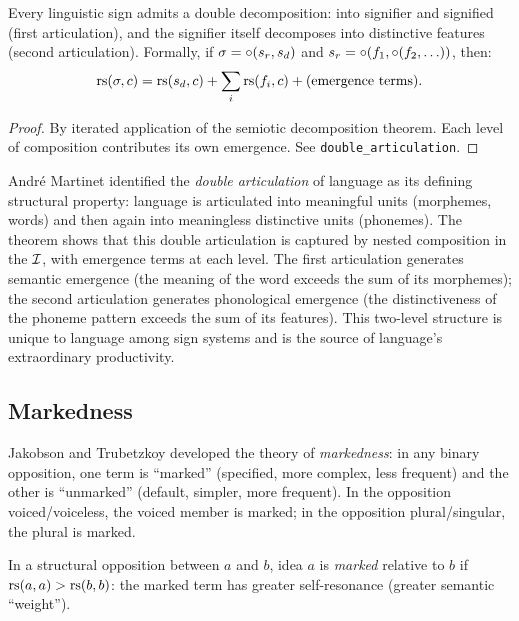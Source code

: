 \begin{theorem}
\label{thm:double-articulation}
Every linguistic sign admits a double decomposition: into signifier
and signified (first articulation), and the signifier itself
decomposes into distinctive features (second articulation). Formally,
if $\sigma = \circ(s_r, s_d)$ and $s_r = \circ(f_1,
\circ(f_2, \ldots))$, then:
\[
  \mathrm{rs}(\sigma, c) = \mathrm{rs}(s_d, c) + \sum_i \mathrm{rs}(f_i, c)
  + \text{(emergence terms)}.
\]
\end{theorem}

\begin{proof}
By iterated application of the semiotic decomposition theorem. Each
level of composition contributes its own emergence. See
\texttt{double\_articulation}.
\end{proof}

\begin{interpretation}
Andr\'e Martinet identified the \emph{double articulation} of language
as its defining structural property: language is articulated into
meaningful units (morphemes, words) and then again into meaningless
distinctive units (phonemes). The theorem shows that this double
articulation is captured by nested composition in the $\mathcal{I}$, with
emergence terms at each level. The first articulation generates
semantic emergence (the meaning of the word exceeds the sum of its
morphemes); the second articulation generates phonological emergence
(the distinctiveness of the phoneme pattern exceeds the sum of its
features). This two-level structure is unique to language among sign
systems and is the source of language's extraordinary productivity.
\end{interpretation}

\subsection{Markedness}

Jakobson and Trubetzkoy developed the theory of \emph{markedness}:
in any binary opposition, one term is ``marked'' (specified, more
complex, less frequent) and the other is ``unmarked'' (default,
simpler, more frequent). In the opposition voiced/voiceless, the
voiced member is marked; in the opposition plural/singular, the
plural is marked.

\begin{definition}[Markedness]
\label{def:markedness}
In a structural opposition between $a$ and $b$, idea $a$ is
\emph{marked} relative to $b$ if $\mathrm{rs}(a, a) > \mathrm{rs}(b, b)$: the
marked term has greater self-resonance (greater semantic ``weight'').
\end{definition}

